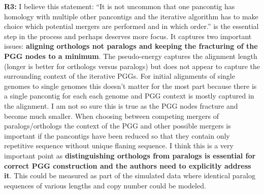 \documentclass[aps,rmp,onecolumn]{revtex4-1}
\newcommand{\Marco}[1]{{\color{orange}Marco: #1}}
\newcommand{\Liam}[1]{{\color{teal}Liam: #1}}
\newcommand{\reviewer}[2]{\textbf{#1:} #2\vskip 5mm}
\begin{document}
\reviewer{R3}{I believe this statement: ``It is not uncommon that one pancontig has homology with multiple other pancontigs and the iterative algorithm has to make choice which potential mergers are performed and in which order.'' is the essential step in the process and perhaps deserves more focus. It captures two important issues: \textbf{aligning orthologs not paralogs and keeping the fracturing of the PGG nodes to a minimum}. The pseudo-energy captures the alignment length (longer is better for orthologs versus paralogs) but does not appear to capture the surrounding context of the iterative PGGs. For initial alignments of single genomes to single genomes this doesn't matter for the most part because there is a single pancontig for each each genome and PGG context is mostly captured in the alignment. I am not so sure this is true as the PGG nodes fracture and become much smaller. When choosing between competing mergers of paralogs/orthologs the context of the PGG and other possible mergers is important if the pancontigs have been reduced so that they contain only repetitive sequence without unique flaning sequence. I think this is a very important point as \textbf{distinguishing orthologs from paralogs is essential for correct PGG construction and the authors need to explicitly address it}. This could be measured as part of the simulated data where identical paralog sequences of various lengths and copy number could be modeled.}
\end{document}
